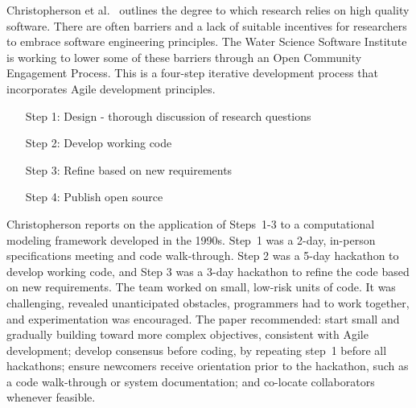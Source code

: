 \documentclass[11pt, oneside]{amsart}
\begin{document}


Christopherson et al.~\cite{Christopherson_WSSSPE} outlines the degree
to which research relies on high quality software. There are often
barriers and a lack of suitable incentives for researchers to embrace
software engineering principles. The Water Science Software Institute
is working to lower some of these barriers through an Open Community
Engagement Process. This is a four-step iterative development process
that incorporates Agile development principles.

\begin{itemize}
\setlength{\itemindent}{0.5in}
\item[Step 1:] Design - thorough discussion of research questions
\item[Step 2:] Develop working code
\item[Step 3:] Refine based on new requirements
\item[Step 4:] Publish open source
\end{itemize}

Christopherson reports on the application of Steps~1-3 to a
computational modeling framework developed in the 1990s. Step~1 was a
2-day, in-person specifications meeting and code walk-through. Step 2
was a 5-day hackathon to develop working code, and Step 3 was a 3-day
hackathon to refine the code based on new requirements. The team
worked on small, low-risk units of code. It was challenging, revealed
unanticipated obstacles, programmers had to work together, and
experimentation was encouraged.
%
The paper recommended: start small and gradually building toward more
complex objectives, consistent with Agile development; develop
consensus before coding, by repeating step~1 before all hackathons;
ensure newcomers receive orientation prior to the hackathon, such as a
code walk-through or system documentation; and co-locate collaborators
whenever feasible.

\end{document}
